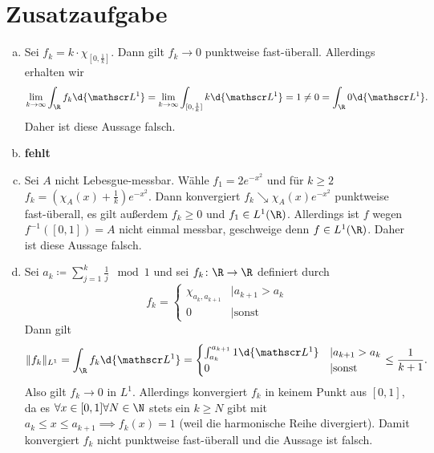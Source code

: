 \documentclass{article}
\newcommand{\norm}[1]{\lVert #1 \rVert}
\begin{document}
    \section*{Zusatzaufgabe}
    \begin{enumerate}[(a)]
        \item Sei $f_k = k \cdot \chi_{[0,\frac{1}{k}]}$. Dann gilt $f_k \to 0$ punktweise fast-überall. Allerdings erhalten wir
        \[
            \lim\limits_{k \to \infty} \int_\R f_k \d{\mathscr L^1} = \lim\limits_{k \to \infty} \int_{[0,\frac{1}{k}]} k \d{\mathscr L^1} = 1 \neq 0 = \int_\R 0 \d{\mathscr L^1}. 
        \]
        Daher ist diese Aussage falsch.
        \item \textbf{fehlt}
        \item Sei $A$ nicht Lebesgue-messbar. Wähle $f_1 = 2e^{-x^2}$ und für $k \geq 2$ $f_k = (\chi_A(x) + \frac{1}{k})e^{-x^2}$. Dann konvergiert $f_k \searrow \chi_A(x)e^{-x^2}$ punktweise fast-überall, es gilt außerdem $f_k \geq 0$ und $f_1 \in L^1(\R)$.
        Allerdings ist $f$ wegen $f^{-1}([0,1]) = A$ nicht einmal messbar, geschweige denn $f \in L^1(\R)$. Daher ist diese Aussage falsch.
        \item Sei $a_k \coloneqq \sum_{j = 1}^{k} \frac{1}{j} \mod 1$ und sei $f_k \colon \R \to \R$ definiert durch 
        \[
            f_k = \begin{cases}
                \chi_{a_k, a_{k+1}} &| a_{k+1} > a_k\\
                0 &| \text{sonst}
            \end{cases}  
        \]
        Dann gilt 
        \[ 
            \norm{f_k}_{L^1} = \int_\R f_k \d{\mathscr L^1} = \begin{cases}
                \int_{a_k}^{a_{k+1}} 1 \d{\mathscr L^1} &| a_{k+1} > a_k\\
                0 &| \text{sonst}
            \end{cases} \leq \frac{1}{k+1}.
        \]
        Also gilt $f_k \to 0$ in $L^1$. Allerdings konvergiert $f_k$ in keinem Punkt aus $[0,1]$, da es $\forall x\in [0,1]\forall N \in \N$ stets ein $k \geq N$ gibt mit $a_k \leq x \leq a_{k+1} \implies f_k(x) = 1$ (weil die harmonische Reihe divergiert).
        Damit konvergiert $f_k$ nicht punktweise fast-überall und die Aussage ist falsch.
    \end{enumerate}
\end{document}

